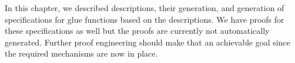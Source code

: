 In this chapter, we described \constructor{} descriptions, their generation, and generation of specifications for glue functions based on the descriptions. We have proofs for these specifications as well but the proofs are currently not automatically generated. Further proof engineering should make that an achievable goal since the required mechanisms are now in place.